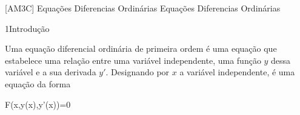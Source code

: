 \documentclass["./AM3C-Class_Annotations.tex"]{subfiles}
\begin{document}

[AM3C]
{Equações Diferencias Ordinárias} %
{Equações Diferencias Ordinárias} %

\begin{sectionBox}1{Introdução} %
  
  Uma equação diferencial ordinária de primeira ordem é uma equação que estabelece uma relação entre uma variável independente, uma função \(y\) dessa variável e a sua derivada \(y'\). Designando por \(x\) a variável independente, é uma equação da forma
  
  \begin{BM}
    F(x,y(x),y'(x))=0
  \end{BM}
\end{sectionBox}
\end{document}

